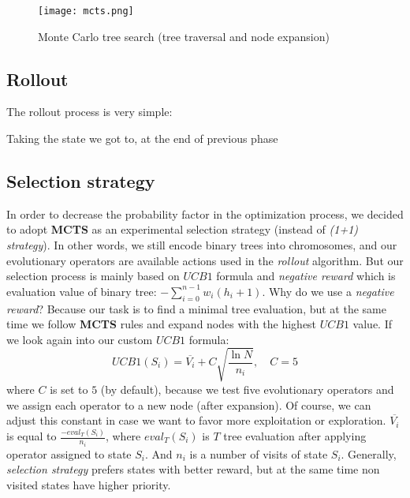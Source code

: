 \documentclass[12pt]{article}
\newcommand{\sumin}[2]{\sum\limits_{#1}^{#2}}
\begin{document}
\begin{figure}
\centering
\texttt{[image: mcts.png]}
\caption{Monte Carlo tree search (tree traversal and node expansion)}
\label{fig:mcts}
\end{figure}

\clearpage

\subsection{Rollout}
The rollout process is very simple:

\begin{algorithm}
\scriptsize
\caption{Taking the state we got to, at the end of previous phase}
\begin{algorithmic}[]

    \LOOP
    \ENDLOOP
\end{algorithmic}
\end{algorithm}

\subsection{Selection strategy}
In order to decrease the probability factor in the optimization process, we decided to adopt \textbf{MCTS} as an experimental selection strategy (instead of \textit{(1+1) strategy}).
In other words, we still encode binary trees into chromosomes, and our evolutionary operators are available actions used in the \textit{rollout} algorithm.
But our selection process is mainly based on $UCB1$ formula and \textit{negative reward} which is evaluation value of binary tree: $-\sumin{i=0}{n-1} w_i (h_i + 1)$.
Why do we use a \textit{negative reward}? Because our task is to find a minimal tree evaluation, but at the same time we follow \textbf{MCTS} rules and expand nodes with the highest $UCB1$ value.
If we look again into our custom $UCB1$ formula:
\[
    UCB1(S_i) = \overline{V_i} + C \sqrt{\frac{\ln{N}}{n_i}},\quad C=5
\]
where $C$ is set to $5$ (by default), because we test five evolutionary operators and we assign each operator to a new node (after expansion). Of course, we can adjust this constant in case we want to favor more exploitation or exploration.
$\overline{V_i}$ is equal to $\frac{-eval_{T}(S_i)}{n_i}$, where $eval_{T}(S_i)$ is $T$ tree evaluation after applying operator assigned to state $S_i$. And $n_i$ is a number of visits of state $S_i$.
Generally, \textit{selection strategy} prefers states with better reward, but at the same time non visited states have higher priority.
\end{document}
